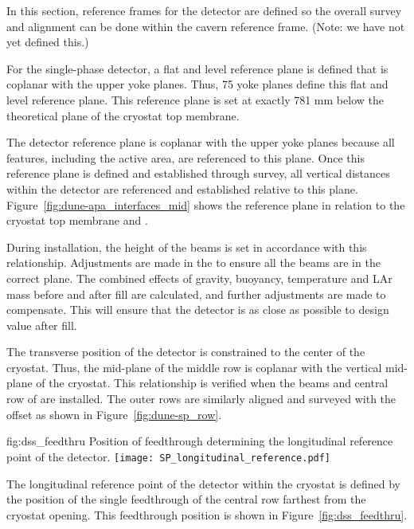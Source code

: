In this section, reference frames for the detector are defined so the overall survey and alignment can be done within
the cavern reference frame. (Note: we have not yet defined this.)


For the single-phase detector, a flat and level reference  plane is
defined that is coplanar with the upper  yoke
planes. Thus, 75 yoke planes define this flat and
level reference  plane. This reference plane is set at exactly 781 mm below the
theoretical plane of the cryostat top membrane.


The detector reference plane is coplanar with the upper
 yoke planes because all features, including
the active area, are referenced  to this plane.  Once this reference
plane is defined and established through survey, all vertical
distances within the detector are referenced 
and established relative to this
plane.  Figure~\ref{fig:dune-apa_interfaces_mid} shows the reference
plane in relation to the cryostat top membrane and .


During installation, the height of the  beams
is set in accordance with this relationship. Adjustments are made in the
 to ensure all the beams are in the
correct plane. The combined effects of gravity, buoyancy, temperature and LAr mass
before and after fill are calculated, and further adjustments are made
to compensate. This will ensure that the detector is as close as
possible to design value after fill.


The transverse position of the detector is constrained to the center
of the cryostat. Thus, the mid-plane of the middle row  is
coplanar with the vertical mid-plane of the cryostat. This
relationship is verified when the  beams and central row of
 are installed. The outer rows are similarly aligned and
surveyed with the offset as shown in Figure~\ref{fig:dune-sp_row}.
\begin{dunefigure}{fig:dss_feedthru}
  {Position of feedthrough determining the longitudinal reference point of the detector.}
  \texttt{[image: SP\_longitudinal\_reference.pdf]}
\end{dunefigure}


The longitudinal reference point of the detector within the cryostat
is defined by the position of the single feedthrough of the central row
farthest from the cryostat opening. This feedthrough position
is shown in Figure~\ref{fig:dss_feedthru}.

